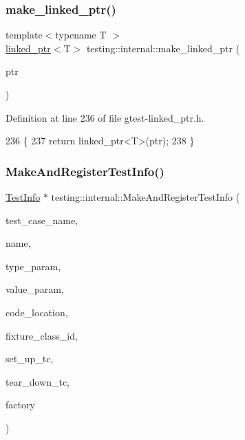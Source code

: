 \subsubsection{\texorpdfstring{make\+\_\+linked\+\_\+ptr()}{make\_linked\_ptr()}}
{\footnotesize\ttfamily template$<$typename T $>$ \\
\hyperlink{classtesting_1_1internal_1_1linked__ptr}{linked\+\_\+ptr}$<$T$>$ testing\+::internal\+::make\+\_\+linked\+\_\+ptr (\begin{DoxyParamCaption}\item[{T $\ast$}]{ptr }\end{DoxyParamCaption})}



Definition at line 236 of file gtest-\/linked\+\_\+ptr.\+h.


\begin{DoxyCode}
236                                       \{
237   \textcolor{keywordflow}{return} linked\_ptr<T>(ptr);
238 \}
\end{DoxyCode}
\mbox{\label{namespacetesting_1_1internal_a7f2e4e46c969fcae9d801d93a3e932fd}} 
\subsubsection{\texorpdfstring{Make\+And\+Register\+Test\+Info()}{MakeAndRegisterTestInfo()}}
{\footnotesize\ttfamily \hyperlink{classtesting_1_1TestInfo}{Test\+Info} $\ast$ testing\+::internal\+::\+Make\+And\+Register\+Test\+Info (\begin{DoxyParamCaption}\item[{const char $\ast$}]{test\+\_\+case\+\_\+name,  }\item[{const char $\ast$}]{name,  }\item[{const char $\ast$}]{type\+\_\+param,  }\item[{const char $\ast$}]{value\+\_\+param,  }\item[{\hyperlink{structtesting_1_1internal_1_1CodeLocation}{Code\+Location}}]{code\+\_\+location,  }\item[{\hyperlink{namespacetesting_1_1internal_ab1114197d3c657d8b7f8e0c5caa12d00}{Type\+Id}}]{fixture\+\_\+class\+\_\+id,  }\item[{\hyperlink{namespacetesting_1_1internal_a30037044c0b57cdd647c7e2e97cb2cff}{Set\+Up\+Test\+Case\+Func}}]{set\+\_\+up\+\_\+tc,  }\item[{\hyperlink{namespacetesting_1_1internal_a085e31321d0d029c04d2a79234f60c1a}{Tear\+Down\+Test\+Case\+Func}}]{tear\+\_\+down\+\_\+tc,  }\item[{\hyperlink{classtesting_1_1internal_1_1TestFactoryBase}{Test\+Factory\+Base} $\ast$}]{factory }\end{DoxyParamCaption})}



